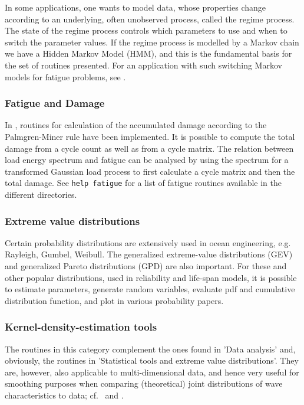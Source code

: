 In some applications, one wants to model data, whose properties
change according to an underlying, often unobserved process,
called the regime process. The state of the regime process
controls which parameters to use and when to switch the
parameter values. If the regime process is modelled by a
Markov chain we have a Hidden Markov Model (HMM),
and this is the fundamental basis for the set of
routines presented. For an application with such switching Markov
models for fatigue problems,
see \cite{Johannesson1998Rainflow,Johannesson1999Rainflow}.%

\subsubsection{Fatigue and Damage}
In \progname{}, routines for calculation of the accumulated damage
according to the Palmgren-Miner rule have been implemented. It
is possible to compute the total damage from a cycle count as
well as from a cycle matrix. The relation between load energy spectrum 
and fatigue can be analysed by using the spectrum 
for a transformed Gaussian load process to first calculate a cycle matrix 
and then the total damage. See {\tt help fatigue} for a list of 
fatigue routines 
available in the different \wf{} directories. %

\subsubsection{Extreme value distributions}
Certain probability distributions are extensively used in
ocean engineering, e.g. Rayleigh, Gumbel, Weibull. The
generalized extreme-value distributions (GEV) and generalized
Pareto distributions (GPD) are also important. For these and other
popular distributions, used in reliability and
life-span models, it is possible to estimate parameters,
generate random variables, evaluate pdf and cumulative
distribution function, and plot in
various probability papers.

\subsubsection{Kernel-density-estimation tools}
The routines in this category complement the ones found in
'Data analysis' and, obviously, the routines in
'Statistical tools and extreme value distributions'.
They are, however, also applicable to multi-dimensional data,
and hence very useful for smoothing purposes when comparing
(theoretical) joint distributions of wave characteristics to
data;
cf.\ \cite{Silverman1986Density} and %
\cite{WandAndJones1995Kernel}.%


